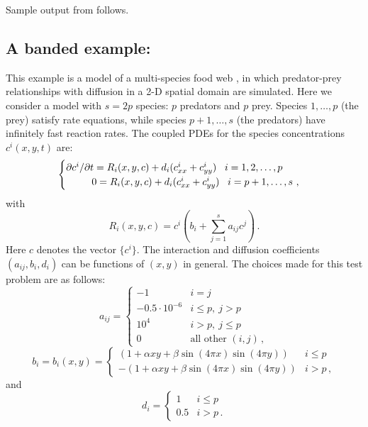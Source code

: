 Sample output from  follows.

\subsection{A banded example: }\label{ss:iwebsb}

This example is a model of a multi-species food web \cite{Bro:86}, in
which predator-prey relationships with diffusion in a 2-D spatial
domain are simulated.  Here we consider a model with $s = 2p$ species:
$p$ predators and $p$ prey.  Species $1,\ldots, p$ (the prey) satisfy
rate equations, while species $p+1,\ldots, s$ (the predators) have
infinitely fast reaction rates.  The coupled PDEs for the species
concentrations $c^i(x,y,t)$ are:
\begin{equation}\label{e:iwebsb_PDE}
  \begin{cases}
    \partial c^i / \partial t = R_i(x,y,c) + d_i 
    ( c^i_{xx} + c^i_{yy} ) \, ~~ i = 1,2,\ldots,p \\
    \hspace*{.36in}        0 = R_i(x,y,c) + d_i 
    ( c^i_{xx} + c^i_{yy} ) \, ~~ i = p+1,\ldots,s ~,
  \end{cases}
\end{equation}
with
\[
R_i(x,y,c) = c^i \left( b_i + \sum_{j=1}^s a_{ij} c^j \right) \, .
\]
Here $c$ denotes the vector $\{c^i\}$.
The interaction and diffusion coefficients $(a_{ij},b_i,d_i)$ can be
functions of $(x,y)$ in general. The choices made for this test
problem are as follows:
\begin{equation*}
  a_{ij} = 
  \begin{cases}
    -1                 & i=j \\
    -0.5 \cdot 10^{-6} & i \leq p , ~ j > p  \\
    10^4               & i > p , ~ j \leq p  \\
    0                  & \mbox{all other } (i,j) \, ,
  \end{cases}
\end{equation*}
\begin{equation*}
  b_i = b_i(x,y) = 
  \begin{cases}
    (1 + \alpha xy + \beta \sin(4\pi x)\sin(4\pi y) )  & i \leq p  \\
    - (1 + \alpha xy + \beta \sin(4\pi x)\sin(4\pi y) )  & i > p \, ,
  \end{cases}
\end{equation*}
and
\begin{equation*}
  d_i = 
  \begin{cases}
    1 & i \leq p  \\
    0.5 & i > p  \, .
  \end{cases}
\end{equation*}

